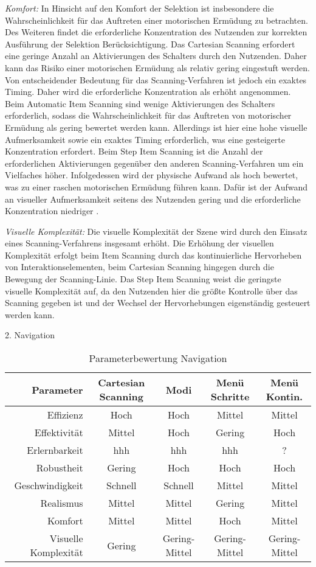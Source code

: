 \textit{Komfort:} 
In Hinsicht auf den Komfort der Selektion ist insbesondere die Wahrscheinlichkeit für das Auftreten einer motorischen Ermüdung zu betrachten. Des Weiteren findet die erforderliche Konzentration des Nutzenden zur korrekten Ausführung der Selektion Berücksichtigung. Das Cartesian Scanning erfordert eine geringe Anzahl an Aktivierungen des Schalters durch den Nutzenden. Daher kann das Risiko einer motorischen Ermüdung als relativ gering eingestuft werden. Von entscheidender Bedeutung für das Scanning-Verfahren ist jedoch ein exaktes Timing. Daher wird die erforderliche Konzentration als erhöht angenommen. 
Beim Automatic Item Scanning sind wenige Aktivierungen des Schalters erforderlich, sodass die Wahrscheinlichkeit für das Auftreten von motorischer Ermüdung als gering bewertet werden kann. Allerdings ist hier eine hohe visuelle Aufmerksamkeit sowie ein exaktes Timing erforderlich, was eine gesteigerte Konzentration erfordert. Beim Step Item Scanning ist die Anzahl der erforderlichen Aktivierungen gegenüber den anderen Scanning-Verfahren um ein Vielfaches höher. Infolgedessen wird der physische Aufwand als hoch bewertet, was zu einer raschen motorischen Ermüdung führen kann. Dafür ist der Aufwand an visueller Aufmerksamkeit seitens des Nutzenden gering und die erforderliche Konzentration niedriger \citep{cook_chapter_2015}. 

\textit{Visuelle Komplexität:}
Die visuelle Komplexität der Szene wird durch den Einsatz eines Scanning-Verfahrens insgesamt erhöht. Die Erhöhung der visuellen Komplexität erfolgt beim Item Scanning durch das kontinuierliche Hervorheben von Interaktionselementen, beim Cartesian Scanning hingegen durch die Bewegung der Scanning-Linie. Das Step Item Scanning weist die geringste visuelle Komplexität auf, da den Nutzenden hier die größte Kontrolle über das Scanning gegeben ist und der Wechsel der Hervorhebungen eigenständig gesteuert werden kann.

2. Navigation 

\begin{table}[ht]
 \centering
 \begin{tabular}{r|c|c|c|c} 
 Parameter & Cartesian Scanning & Modi & Menü Schritte & Menü Kontin.\\
 \hline
 Effizienz & Hoch & Hoch & Mittel & Mittel\\
 Effektivität & Mittel & Hoch & Gering & Hoch\\
 Erlernbarkeit & hhh & hhh & hhh & ?\\
 Robustheit & Gering & Hoch & Hoch & Hoch\\
 Geschwindigkeit & Schnell & Schnell & Mittel & Mittel\\
 Realismus & Mittel & Mittel & Gering & Mittel \\
 Komfort & Mittel & Mittel & Hoch & Mittel\\
 Visuelle Komplexität & Gering & Gering-Mittel & Gering-Mittel & Gering-Mittel
 \end{tabular}
 \caption{Parameterbewertung Navigation}
 \label{tab:Navi}
\end{table}

